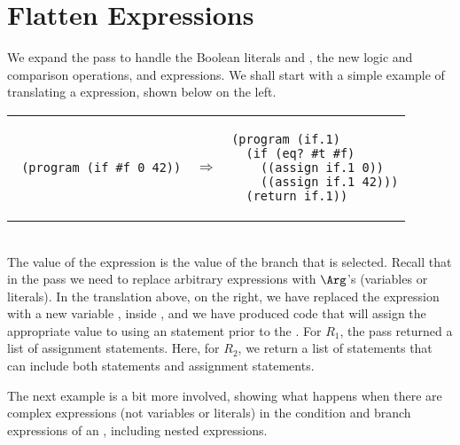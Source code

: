 \documentclass[11pt]{book}
\begin{document}
\section{Flatten Expressions}
\label{sec:flatten-r2}

We expand the  pass to handle the Boolean literals
 and , the new logic and comparison operations, and
 expressions. We shall start with a simple example of
translating a  expression, shown below on the left. \\
\begin{tabular}{lll}
\begin{minipage}{0.4\textwidth}
\begin{lstlisting}
 (program (if #f 0 42))
\end{lstlisting}
\end{minipage}
&
$\Rightarrow$
&
\begin{minipage}{0.4\textwidth}
\begin{lstlisting}
(program (if.1)
  (if (eq? #t #f)
    ((assign if.1 0))
    ((assign if.1 42)))
  (return if.1))
\end{lstlisting}
\end{minipage}
\end{tabular} \\
The value of the  expression is the value of the branch that
is selected. Recall that in the  pass we need to replace
arbitrary expressions with $\Arg$'s (variables or literals). In the
translation above, on the right, we have replaced the 
expression with a new variable , inside , and we have produced code that will assign the appropriate
value to  using an  statement prior to the
.  For $R_1$, the  pass returned a list of
assignment statements. Here, for $R_2$, we return a list of statements
that can include both  statements and assignment statements.

The next example is a bit more involved, showing what happens when
there are complex expressions (not variables or literals) in the
condition and branch expressions of an , including nested
 expressions.
\end{document}
